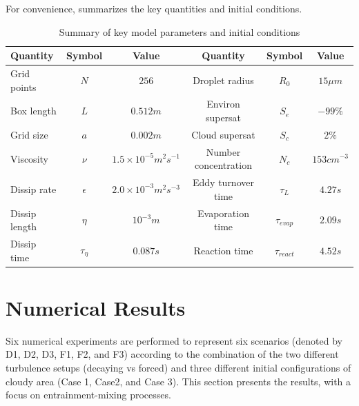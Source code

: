 \documentclass[draft,jgrga]{AGUTeX}
\begin{document}
\begin{article}
For convenience,  summarizes the key quantities and initial conditions.
\begin{table}[T]
\begin{tabular}{l c c c c c}
\hline\hline
Quantity & Symbol & Value & Quantity & Symbol & Value\\
\hline
Grid points & $N$ & $256$ & Droplet radius & $R_{0}$ & $15\mu m$\\
Box length & $L$ & $0.512m$ & Environ supersat & $S_{e}$ & $-99\%$\\
Grid size & $a$ & $0.002m$ & Cloud supersat & $S_{c}$ & $2\%$\\
Viscosity & $\nu$ & $1.5\times10^{-5}m^{2}s^{-1}$ & Number concentration& $N_{c}$ & $153cm^{-3}$\\
Dissip rate& $\epsilon$ & $2.0\times10^{-3}m^{2}s^{-3}$ & Eddy turnover time & $\tau_{L}$ & $4.27s$\\
Dissip length& $\eta$ & $10^{-3}m$ & Evaporation time & $\tau_{evap}$ & $2.09s$\\
Dissip time& $\tau_{\eta}$ & $0.087s$ & Reaction time & $\tau_{react}$ & $4.52s$\\
\hline
\end{tabular}
\caption{Summary of key model parameters and initial conditions}
\label{tb:parameters}
\end{table}

\section{Numerical Results}\label{numerical_results}
Six numerical experiments are performed to represent six scenarios (denoted by D1, D2, D3, F1, F2, and F3) according to the combination of the two different turbulence setups (decaying vs forced) and three different initial configurations of cloudy area (Case 1, Case2, and Case 3). This section presents the results, with a focus on entrainment-mixing processes. 


\end{article}
\end{document}
